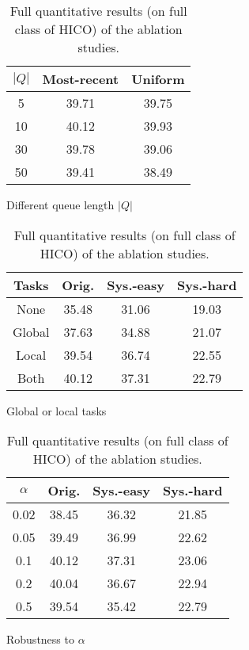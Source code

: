 \documentclass{article} \usepackage{iclr2022_conference,times}
\begin{document}
\begin{table}[h]
    \begin{subtable}[t]{0.49\textwidth}
        \centering
    \begin{tabular}{ccc}
    \toprule
         $|Q|$ & Most-recent &Uniform  \\
    \midrule
         5 &39.71 &39.75  \\
         10 &40.12 &39.93 \\
         30 &39.78 &39.06 \\
         50 &39.41 &38.49 \\
    \bottomrule
    \end{tabular}
    \caption{Different queue length $|Q|$}
    \label{tab:quant_d}
    \end{subtable}
    \vfill
    \setlength\tabcolsep{3pt}
    \begin{subtable}[t]{0.49\textwidth}
        \centering
    \begin{tabular}{cccc}
    \toprule
         Tasks & Orig.& Sys.-easy & Sys.-hard  \\
    \midrule
         None & 35.48 &31.06 &19.03 \\
         Global &37.63 &34.88 &21.07 \\
         Local &39.54 &36.74 &22.55 \\
         Both &40.12 &37.31 &22.79 \\
    \bottomrule
    \end{tabular}
    \caption{Global or local tasks}
    \label{tab:quant_e}
    \end{subtable}
    \hfill
    \setlength\tabcolsep{3pt}
    \begin{subtable}[t]{0.49\textwidth}
    \centering
    \begin{tabular}{cccc}
    \toprule
         $\alpha$ & Orig.& Sys.-easy & Sys.-hard  \\
    \midrule
         0.02 &38.45 &36.32 &21.85 \\
         0.05 &39.49 &36.99 &22.62 \\
         0.1 &40.12 &37.31 &23.06 \\
         0.2 &40.04 &36.67 &22.94 \\
         0.5 &39.54 &35.42 &22.79 \\
    \bottomrule
    \end{tabular}
    \caption{Robustness to $\alpha$}
    \label{tab:quant_f}
    \end{subtable}
    \caption{Full quantitative results (on full class of HICO) of the ablation studies.}
    \label{tab:quant_ablations}
\end{table}
\end{document}
